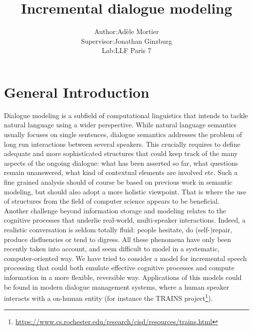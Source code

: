\documentclass[11pt]{article}
\begin{document}
	\title{Incremental dialogue modeling}
	\author{\begin{tabular}{rcl}
			Author &:& Adèle Mortier \\
		Supervisor &:& Jonathan Ginzburg\\
		Lab &:& LLF Paris 7
		\end{tabular}
		}
	\maketitle
	\section*{General Introduction}
		Dialogue modeling is a subfield of computational linguistics that intends to tackle natural language using a wider perspective. While natural language semantics usually focuses on single sentences, dialogue semantics addresses the problem of long run interactions between several speakers. This crucially requires to define adequate and more sophisticated structures that could keep track of the many aspects of the ongoing dialogue: what has been asserted so far, what questions remain unanswered, what kind of contextual elements are involved etc. Such a fine grained analysis should of course be based on previous work in semantic modeling, but should also adopt a more holistic viewpoint. That is where the use of structures from the field of computer science appears to be beneficial.\\
		
		Another challenge beyond information storage and modeling relates to the cognitive processes that underlie real-world, multi-speaker interactions. Indeed, a realistic conversation is seldom totally fluid: people hesitate, do (self-)repair, produce disfluencies or tend to digress. All these phenomena have only been recently taken into account, and seem difficult to model in a systematic, computer-oriented way. We have tried to consider a model for incremental speech processing that could both emulate effective cognitive processes and compute information in a more flexible, reversible way. Applications of this models could be found in modern dialogue management systems, where a human speaker interacts with a on-human entity (for instance the TRAINS project\footnote{\href{https://www.cs.rochester.edu/research/cisd/resources/trains.html}{https://www.cs.rochester.edu/research/cisd/resources/trains.html}}).
		
\end{document}

